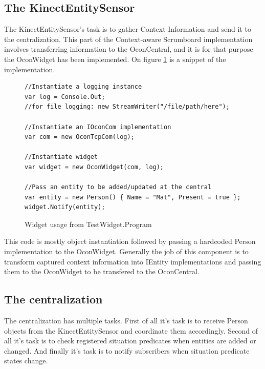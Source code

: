 \documentclass[../report.tex]{subfiles}
\begin{document}
\subsection{The KinectEntitySensor}
The KinectEntitySensor's task is to gather Context Information and send it to the centralization. This part of the Context-aware Scrumboard implementation involves transferring information to the OconCentral, and it is for that purpose the OconWidget has been implemented. On figure \ref{code:OconWidget} is a snippet of the implementation.
\begin{figure}[H]
\begin{lstlisting}
//Instantiate a logging instance
var log = Console.Out;
//for file logging: new StreamWriter("/file/path/here");

//Instantiate an IOconCom implementation
var com = new OconTcpCom(log);

//Instantiate widget
var widget = new OconWidget(com, log);

//Pass an entity to be added/updated at the central
var entity = new Person() { Name = "Mat", Present = true };
widget.Notify(entity);
\end{lstlisting}
\caption{Widget usage from TestWidget.Program}
\label{code:OconWidget}
\end{figure}

This code is mostly object instantiation followed by passing a hardcoded Person implementation to the OconWidget. Generally the job of this component is to transform captured context information into IEntity implementations and passing them to the OconWidget to be transfered to the OconCentral.



\newpage


\subsection{The centralization}


The centralization has multiple tasks. First of all it's task is to receive Person objects from the KinectEntitySensor and coordinate them accordingly. Second of all it's task is to check registered situation predicates when entities are added or changed. And finally it's task is to notify subscribers when situation predicate states change.
\end{document}
